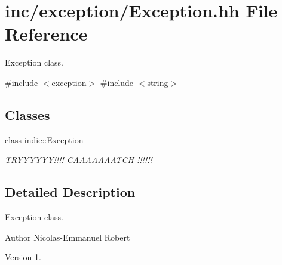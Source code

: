 \hypertarget{Exception_8hh}{}\section{inc/exception/\+Exception.hh File Reference}
\label{Exception_8hh}


Exception class.  


{\ttfamily \#include $<$exception$>$}\newline
{\ttfamily \#include $<$string$>$}\newline
\subsection*{Classes}
\begin{DoxyCompactItemize}
\item 
class \hyperlink{classindie_1_1Exception}{indie\+::\+Exception}
\begin{DoxyCompactList}\small\item\em T\+R\+Y\+Y\+Y\+Y\+Y\+Y!!!! C\+A\+A\+A\+A\+A\+A\+A\+T\+CH !!!!!! \end{DoxyCompactList}\end{DoxyCompactItemize}


\subsection{Detailed Description}
Exception class. 

\begin{DoxyAuthor}{Author}
Nicolas-\/\+Emmanuel Robert 
\end{DoxyAuthor}
\begin{DoxyVersion}{Version}
1. 
\end{DoxyVersion}
